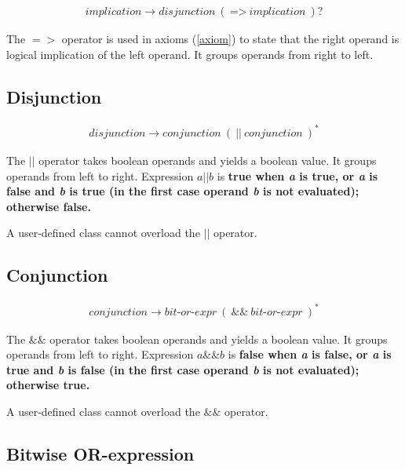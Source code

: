 \documentclass[a4paper,oneside,11pt]{article}
\begin{document}
\begin{align*}
implication \rightarrow \hyperref[disjunction]{disjunction} \> ( \> \texttt{=>} \> implication \> )?
\end{align*}

The $=>$ operator is used in axioms (\ref{axiom}) to state that the right operand is logical implication of the left
operand. It groups operands from right to left.

\subsection{Disjunction}\label{disjunction}

\begin{align*}
disjunction \rightarrow  \hyperref[conjunction]{conjunction} \> ( \> \texttt{||} \> \hyperref[conjunction]{conjunction} \>)^*
\end{align*}

The $||$ operator takes boolean operands and yields a boolean value. It groups operands from left to right.
Expression $a || b$ is \bf{true} when \emph{a} is \bf{true}, or \emph{a} is \bf{false} and \emph{b} is \bf{true}
(in the first case operand \emph{b} is not evaluated); otherwise \bf{false}.

A user-defined class cannot overload the $||$ operator.

\subsection{Conjunction}\label{conjunction}

\begin{align*}
conjunction \rightarrow \hyperref[bitor]{bit\textrm{-}or\textrm{-}expr} \> ( \> \texttt{\&\&} \> \hyperref[bitor]{bit\textrm{-}or\textrm{-}expr} \>)^*
\end{align*}

The $\&\&$ operator takes boolean operands and yields a boolean value. It groups operands from left to right.
Expression $a \&\& b$ is \bf{false} when \emph{a} is \bf{false}, or \emph{a} is \bf{true} and \emph{b} is \bf{false}
(in the first case operand \emph{b} is not evaluated); otherwise \bf{true}.

A user-defined class cannot overload the $\&\&$ operator.

\subsection{Bitwise OR-expression}\label{bitor}
\end{document}
